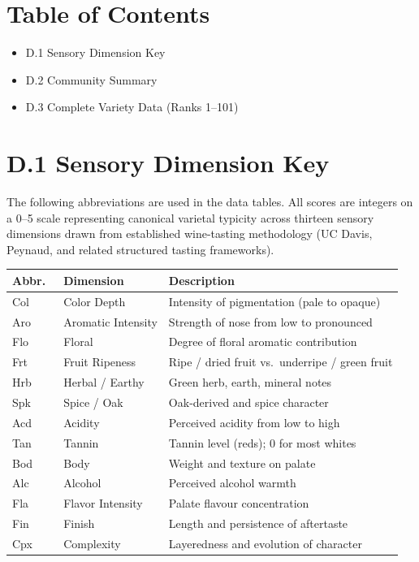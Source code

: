 \documentclass[11pt]{article}
\begin{document}

\section*{Table of Contents}
\begin{itemize}[leftmargin=2em,itemsep=0.1em,topsep=0.1em]
\item D.1 Sensory Dimension Key
\item D.2 Community Summary
\item D.3 Complete Variety Data (Ranks 1--101)
\end{itemize}

\section*{D.1 Sensory Dimension Key}
The following abbreviations are used in the data tables. All scores are integers on a 0--5 scale representing canonical varietal typicity across thirteen sensory dimensions drawn from established wine-tasting methodology (UC Davis, Peynaud, and related structured tasting frameworks).

\begin{center}
\begin{tabular}{@{}lll@{}}
\toprule
Abbr.\ & Dimension & Description \\
\midrule
Col & Color Depth         & Intensity of pigmentation (pale to opaque) \\
Aro & Aromatic Intensity  & Strength of nose from low to pronounced \\
Flo & Floral              & Degree of floral aromatic contribution \\
Frt & Fruit Ripeness      & Ripe / dried fruit vs.\ underripe / green fruit \\
Hrb & Herbal / Earthy     & Green herb, earth, mineral notes \\
Spk & Spice / Oak         & Oak-derived and spice character \\
Acd & Acidity             & Perceived acidity from low to high \\
Tan & Tannin              & Tannin level (reds); 0 for most whites \\
Bod & Body                & Weight and texture on palate \\
Alc & Alcohol             & Perceived alcohol warmth \\
Fla & Flavor Intensity    & Palate flavour concentration \\
Fin & Finish              & Length and persistence of aftertaste \\
Cpx & Complexity          & Layeredness and evolution of character \\
\bottomrule
\end{tabular}
\end{center}
\end{document}
